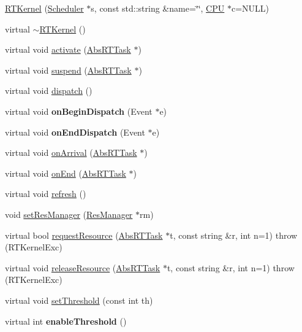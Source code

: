 \begin{DoxyCompactItemize}
\item 
\hyperlink{classRTSim_1_1RTKernel_a775bf589feac92aa3e8ae1d489381650}{R\+T\+Kernel} (\hyperlink{classRTSim_1_1Scheduler}{Scheduler} $\ast$s, const std\+::string \&name=\char`\"{}\char`\"{}, \hyperlink{classRTSim_1_1CPU}{C\+PU} $\ast$c=N\+U\+LL)
\item 
virtual \hyperlink{classRTSim_1_1RTKernel_a38234487b31fd3cbc99646403001aa3c}{$\sim$\+R\+T\+Kernel} ()
\item 
virtual void \hyperlink{classRTSim_1_1RTKernel_a87d98a7fe77c37cb49034a132311a552}{activate} (\hyperlink{classRTSim_1_1AbsRTTask}{Abs\+R\+T\+Task} $\ast$)
\item 
virtual void \hyperlink{classRTSim_1_1RTKernel_a9cc3e67f5f9ca883246d024d071a13b1}{suspend} (\hyperlink{classRTSim_1_1AbsRTTask}{Abs\+R\+T\+Task} $\ast$)
\item 
virtual void \hyperlink{classRTSim_1_1RTKernel_ac50b6580580d5380261d7b9e84f5e08a}{dispatch} ()
\item 
virtual void {\bfseries on\+Begin\+Dispatch} (Event $\ast$e)\hypertarget{classRTSim_1_1RTKernel_ae7285d05124d4e1c0f7fa05b1afca9cf}{}\label{classRTSim_1_1RTKernel_ae7285d05124d4e1c0f7fa05b1afca9cf}

\item 
virtual void {\bfseries on\+End\+Dispatch} (Event $\ast$e)\hypertarget{classRTSim_1_1RTKernel_a31b5e4c8f7ff6f65cb69cfe9f4a8acf4}{}\label{classRTSim_1_1RTKernel_a31b5e4c8f7ff6f65cb69cfe9f4a8acf4}

\item 
virtual void \hyperlink{classRTSim_1_1RTKernel_aec25abba77131876143e5fd395fe7b7e}{on\+Arrival} (\hyperlink{classRTSim_1_1AbsRTTask}{Abs\+R\+T\+Task} $\ast$)
\item 
virtual void \hyperlink{classRTSim_1_1RTKernel_af3d6767555d2d7ea9ee029a892d5bc43}{on\+End} (\hyperlink{classRTSim_1_1AbsRTTask}{Abs\+R\+T\+Task} $\ast$)
\item 
virtual void \hyperlink{classRTSim_1_1RTKernel_a0032c42f0589c73721b5880ea6188fac}{refresh} ()
\item 
void \hyperlink{classRTSim_1_1RTKernel_a1e8f5b51180348e12100a630707e9dda}{set\+Res\+Manager} (\hyperlink{classRTSim_1_1ResManager}{Res\+Manager} $\ast$rm)
\item 
virtual bool \hyperlink{classRTSim_1_1RTKernel_ab43eb6107bda5a0c326ecf46642628b7}{request\+Resource} (\hyperlink{classRTSim_1_1AbsRTTask}{Abs\+R\+T\+Task} $\ast$t, const string \&r, int n=1)  throw (\+R\+T\+Kernel\+Exc)
\item 
virtual void \hyperlink{classRTSim_1_1RTKernel_a1f62880205ac0e6bc08484a761bb449b}{release\+Resource} (\hyperlink{classRTSim_1_1AbsRTTask}{Abs\+R\+T\+Task} $\ast$t, const string \&r, int n=1)  throw (\+R\+T\+Kernel\+Exc)
\item 
virtual void \hyperlink{classRTSim_1_1RTKernel_ae6fa4ba9b518b799142bbe22a4ed1e8d}{set\+Threshold} (const int th)
\item 
virtual int {\bfseries enable\+Threshold} ()\hypertarget{classRTSim_1_1RTKernel_afa762282eb758fb57f4a1f55ff2e1487}{}\label{classRTSim_1_1RTKernel_afa762282eb758fb57f4a1f55ff2e1487}


\end{DoxyCompactItemize}
